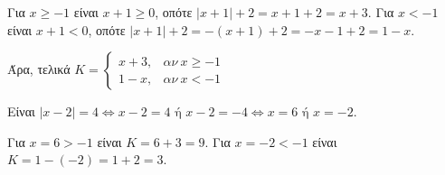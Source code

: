 
\begin{alist}
\item Για $x \ge -1$ είναι $x + 1 \ge 0$, οπότε $|x + 1| + 2 = x + 1 + 2 = x + 3$.
Για $x < -1$ είναι $x + 1 < 0$, οπότε $|x + 1| + 2 = -(x + 1) + 2 = -x - 1 + 2 = 1 - x$.

Άρα, τελικά $K = \begin{cases} x + 3, & \alpha\nu \ x \ge -1 \\ 1 - x, & \alpha\nu \ x < -1 \end{cases}$

\item 
\begin{rlist}
\item Είναι $|x - 2| = 4 \Leftrightarrow x - 2 = 4 \text{ ή } x - 2 = -4 \Leftrightarrow x = 6 \text{ ή } x = -2$.
\item Για $x = 6 > -1$ είναι $K = 6 + 3 = 9$.
Για $x = -2 < -1$ είναι $K = 1 - (-2) = 1 + 2 = 3$.
\end{rlist}
\end{alist}

